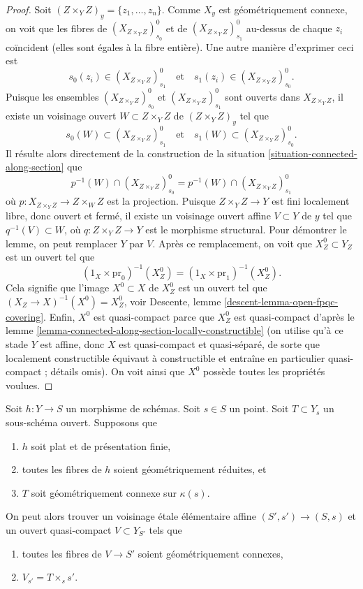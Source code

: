 \begin{proof}
\medskip\noindent
Soit $(Z \times_Y Z)_y = \{z_1, \ldots, z_n\}$.
Comme $X_y$ est géométriquement connexe, on voit que les fibres de
$(X_{Z \times_Y Z})_{s_0}^0$ et de $(X_{Z \times_Y Z})_{s_1}^0$
au-dessus de chaque $z_i$ coïncident (elles sont égales à la fibre entière). Une autre
manière d'exprimer ceci est
$$
s_0(z_i) \in (X_{Z \times_Y Z})_{s_1}^0
\quad\text{et}\quad
s_1(z_i) \in (X_{Z \times_Y Z})_{s_0}^0.
$$
Puisque les ensembles $(X_{Z \times_Y Z})_{s_0}^0$ et $(X_{Z \times_Y Z})_{s_1}^0$
sont ouverts dans $X_{Z \times_Y Z}$, il existe un voisinage ouvert
$W \subset Z \times_Y Z$ de $(Z \times_Y Z)_y$ tel que
$$
s_0(W) \subset (X_{Z \times_Y Z})_{s_1}^0
\quad\text{et}\quad
s_1(W) \subset (X_{Z \times_Y Z})_{s_0}^0.
$$
Il résulte alors directement de la construction de la
situation \ref{situation-connected-along-section}
que
$$
p^{-1}(W) \cap (X_{Z \times_Y Z})_{s_0}^0
=
p^{-1}(W) \cap (X_{Z \times_Y Z})_{s_1}^0
$$
où $p : X_{Z \times_Y Z} \to Z \times_W Z$ est la projection.
Puisque $Z \times_Y Z \to Y$ est fini localement libre, donc ouvert et fermé,
il existe un voisinage ouvert affine $V \subset Y$ de $y$ tel que
$q^{-1}(V) \subset W$, où $q : Z \times_Y Z \to Y$ est le
morphisme structural. Pour démontrer le lemme, on peut remplacer $Y$ par $V$.
Après ce remplacement, on voit que $X_Z^0 \subset Y_Z$ est un ouvert tel que
$$
(1_X \times \text{pr}_0)^{-1}(X_Z^0) =
(1_X \times \text{pr}_1)^{-1}(X_Z^0).
$$
Cela signifie que l'image $X^0 \subset X$ de $X_Z^0$ est un ouvert tel
que $(X_Z \to X)^{-1}(X^0) = X_Z^0$, voir
Descente, lemme \ref{descent-lemma-open-fpqc-covering}.
Enfin, $X^0$ est quasi-compact parce que $X_Z^0$ est quasi-compact
d'après le lemme \ref{lemma-connected-along-section-locally-constructible}
(on utilise qu'à ce stade $Y$ est affine, donc $X$ est quasi-compact et
quasi-séparé, de sorte que localement constructible équivaut à constructible
et entraîne en particulier quasi-compact ; détails omis).
On voit ainsi que $X^0$ possède toutes les propriétés voulues.
\end{proof}

\begin{lemma}
\label{lemma-fibre-geometrically-connected-reduced}
Soit $h : Y \to S$ un morphisme de schémas.
Soit $s \in S$ un point.
Soit $T \subset Y_s$ un sous-schéma ouvert.
Supposons que
\begin{enumerate}
\item $h$ soit plat et de présentation finie,
\item toutes les fibres de $h$ soient géométriquement réduites, et
\item $T$ soit géométriquement connexe sur $\kappa(s)$.
\end{enumerate}
On peut alors trouver un voisinage \'etale élémentaire affine
$(S', s') \to (S, s)$
et un ouvert quasi-compact $V \subset Y_{S'}$ tels que
\begin{enumerate}
\item[(a)] toutes les fibres de $V \to S'$ soient géométriquement connexes,
\item[(b)] $V_{s'} = T \times_s s'$.
\end{enumerate}
\end{lemma}

